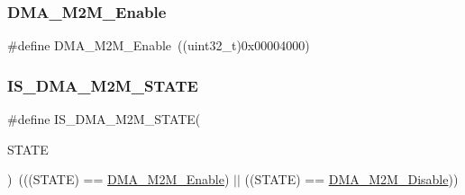 \mbox{\label{group___d_m_a__memory__to__memory_ga046a1de15235c254c0511c08cae3065a}} 
\subsubsection{\texorpdfstring{DMA\_M2M\_Enable}{DMA\_M2M\_Enable}}
{\footnotesize\ttfamily \#define D\+M\+A\+\_\+\+M2\+M\+\_\+\+Enable~((uint32\+\_\+t)0x00004000)}

\mbox{\label{group___d_m_a__memory__to__memory_gae0241d6265efc45f87b113cf44e50c06}} 
\subsubsection{\texorpdfstring{IS\_DMA\_M2M\_STATE}{IS\_DMA\_M2M\_STATE}}
{\footnotesize\ttfamily \#define I\+S\+\_\+\+D\+M\+A\+\_\+\+M2\+M\+\_\+\+S\+T\+A\+TE(\begin{DoxyParamCaption}\item[{}]{S\+T\+A\+TE }\end{DoxyParamCaption})~(((S\+T\+A\+TE) == \mbox{\hyperlink{group___d_m_a__memory__to__memory_ga046a1de15235c254c0511c08cae3065a}{D\+M\+A\+\_\+\+M2\+M\+\_\+\+Enable}}) $\vert$$\vert$ ((S\+T\+A\+TE) == \mbox{\hyperlink{group___d_m_a__memory__to__memory_ga86e0a7076f0badd509fac6576f3b5355}{D\+M\+A\+\_\+\+M2\+M\+\_\+\+Disable}}))}

